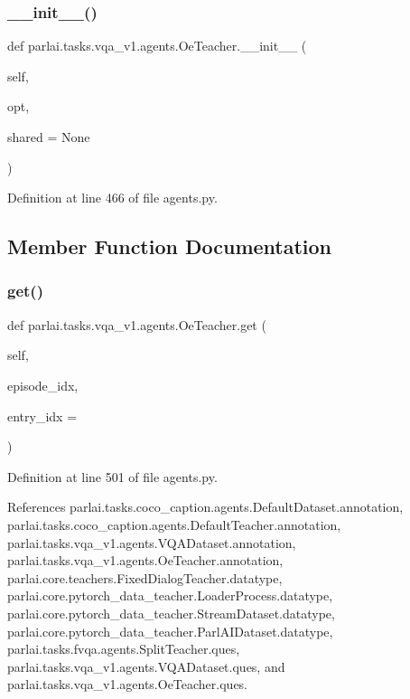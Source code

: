 \subsubsection{\texorpdfstring{\+\_\+\+\_\+init\+\_\+\+\_\+()}{\_\_init\_\_()}}
{\footnotesize\ttfamily def parlai.\+tasks.\+vqa\+\_\+v1.\+agents.\+Oe\+Teacher.\+\_\+\+\_\+init\+\_\+\+\_\+ (\begin{DoxyParamCaption}\item[{}]{self,  }\item[{}]{opt,  }\item[{}]{shared = {\ttfamily None} }\end{DoxyParamCaption})}



Definition at line 466 of file agents.\+py.



\subsection{Member Function Documentation}
\mbox{\label{classparlai_1_1tasks_1_1vqa__v1_1_1agents_1_1OeTeacher_a932ca5499779ef050d1fdb605c9e7f67}} 
\subsubsection{\texorpdfstring{get()}{get()}}
{\footnotesize\ttfamily def parlai.\+tasks.\+vqa\+\_\+v1.\+agents.\+Oe\+Teacher.\+get (\begin{DoxyParamCaption}\item[{}]{self,  }\item[{}]{episode\+\_\+idx,  }\item[{}]{entry\+\_\+idx = {} }\end{DoxyParamCaption})}



Definition at line 501 of file agents.\+py.



References parlai.\+tasks.\+coco\+\_\+caption.\+agents.\+Default\+Dataset.\+annotation, parlai.\+tasks.\+coco\+\_\+caption.\+agents.\+Default\+Teacher.\+annotation, parlai.\+tasks.\+vqa\+\_\+v1.\+agents.\+V\+Q\+A\+Dataset.\+annotation, parlai.\+tasks.\+vqa\+\_\+v1.\+agents.\+Oe\+Teacher.\+annotation, parlai.\+core.\+teachers.\+Fixed\+Dialog\+Teacher.\+datatype, parlai.\+core.\+pytorch\+\_\+data\+\_\+teacher.\+Loader\+Process.\+datatype, parlai.\+core.\+pytorch\+\_\+data\+\_\+teacher.\+Stream\+Dataset.\+datatype, parlai.\+core.\+pytorch\+\_\+data\+\_\+teacher.\+Parl\+A\+I\+Dataset.\+datatype, parlai.\+tasks.\+fvqa.\+agents.\+Split\+Teacher.\+ques, parlai.\+tasks.\+vqa\+\_\+v1.\+agents.\+V\+Q\+A\+Dataset.\+ques, and parlai.\+tasks.\+vqa\+\_\+v1.\+agents.\+Oe\+Teacher.\+ques.




